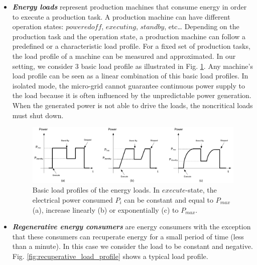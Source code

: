 \begin{itemize}
 \item{\textit{\textbf{Energy loads}} represent production machines that consume energy in order to execute a production task. A production machine can have different operation states: $powered off$, $executing$, $stand by$, etc… Depending on the production task and the operation state, a production machine can follow a predefined or a characteristic load profile. For a fixed set of production tasks, the load profile of a machine can be measured and approximated. In our setting, we consider 3 basic load profile as illustrated in Fig. \ref{fig:load_profile}. Any machine\rq{s} load profile can be seen as a linear combination of this basic load profiles. In isolated mode, the micro-grid cannot guarantee continuous power supply to the load because it is often influenced by the unpredictable power generation. When the generated power is not able to drive the loads, the noncritical loads must shut down.}
 
%
\begin{figure}[h!]
\includegraphics[scale=.40]{images/load_profile}
%
%
\caption{Basic load profiles of the energy loads. In $execute$-state,  the electrical power consumed $P_i$ can be constant and equal to $P_{max}$ (a), increase linearly (b) or exponentially (c) to $P_{max}$.}
\label{fig:load_profile}       %
\end{figure}

 
\item{\textit{\textbf{Regenerative energy consumers}} are energy consumers with the exception that these consumers can recuperate energy for a small period of time (less than a minute). In this case we consider the load to be constant and negative. Fig. \ref{fig:recuperative_load_profile} shows a typical load profile.}


\end{itemize}
